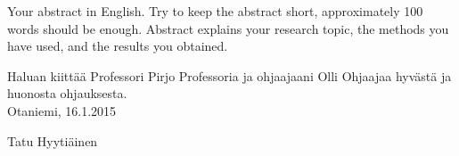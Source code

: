 \documentclass[finnish,12pt,a4paper,pdftex,sci,utf8]{aaltothesis}
\begin{document}
\newpage
%
\begin{abstractpage}[english]
Your abstract in English. Try to keep the abstract short, approximately 
 100 words should be enough. Abstract explains your research topic, 
 the methods you have used, and the results you obtained.  
\end{abstractpage}

\newpage
%



Haluan kiittää Professori Pirjo 
Professoria ja ohjaajaani Olli Ohjaajaa hyvästä ja 
huonosta ohjauksesta.\\

\vspace{5cm}
Otaniemi, 16.1.2015

\vspace{5mm}
{\hfill Tatu Hyytiäinen \hspace{1cm}}

\newpage


\thesistableofcontents


\cleardoublepage
\storeinipagenumber
{}
\setcounter{page}{1}
\end{document}
